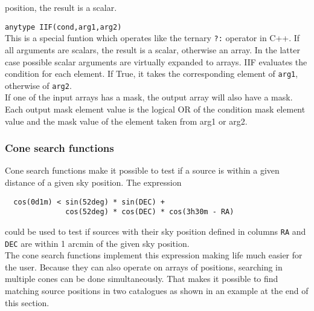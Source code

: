 \begin{description}
    position, the result is a scalar.
  \item[] \texttt{anytype IIF(cond,arg1,arg2)}\\
    This is a special funtion which operates like the ternary \texttt{?:}
    operator in C++. 
    If all arguments are scalars, the result is a scalar, otherwise
    an array. In the latter case possible scalar arguments are
    virtually expanded to arrays.
    IIF evaluates the condition for each element. If True, it takes
    the corresponding element of \texttt{arg1}, otherwise of
    \texttt{arg2}.
    \\If one of the input arrays has a mask, the output array will
    also have a mask. Each output mask element value is the logical OR of the
    condition mask element value and the mask value of the element taken
    from arg1 or arg2.
\end{description}

\subsubsection{\label{TAQL:CONESEARCH}Cone search functions}
Cone search functions make it possible to test if a source is
within a given distance of a given sky position. The expression
\begin{verbatim}
  cos(0d1m) < sin(52deg) * sin(DEC) +
              cos(52deg) * cos(DEC) * cos(3h30m - RA)
\end{verbatim}
could be used to test if sources with their sky position defined
in columns \texttt{RA} and \texttt{DEC} are within 1 arcmin of the
given sky position.
\\The cone search functions implement this expression making life much
easier for the user. Because they
can also operate on arrays of positions, searching in
multiple cones can be done simultaneously. That makes it
possible to find matching source positions in two catalogues as shown
in an example at the end of this section.

